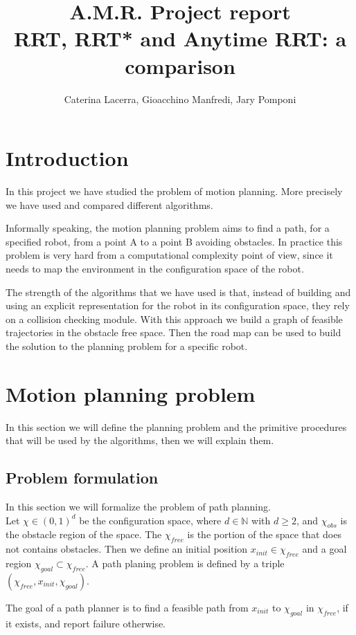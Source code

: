 \documentclass[10pt]{article}
\title{A.M.R. Project report\\RRT, RRT* and Anytime RRT: a comparison}
\author{Caterina Lacerra, Gioacchino Manfredi, Jary Pomponi}
\begin{document}
	\maketitle
	\section{Introduction}
	In this project we have studied the problem of motion planning. More precisely we have used and compared different algorithms. 
	
	Informally speaking, the motion planning problem aims to find a path, for a specified robot, from a point A to a point B avoiding obstacles. In practice this problem is very hard from a computational complexity point of view, since it needs to map the environment in the configuration space of the robot. 
	
	The strength of the algorithms that we have used is that, instead of building and using an explicit representation for the robot in its configuration space, they rely on a collision checking module. With this approach we build a graph of feasible trajectories in the obstacle free space. Then the road map can be used to build the solution to the planning problem for a specific robot.
	
	\section{Motion planning problem}
	In this section we will define the planning problem and the primitive procedures that will be used by the algorithms, then we will explain them.
	
	\subsection{Problem formulation}
	In this section we will formalize the problem of path planning.\\
	
	Let $\chi \in(0,1)^d$ be the configuration space, where $d\in\mathbb{N}$ with $d\ge2$, and $\chi_{obs}$ is the obstacle region of the space. The $\chi_{free}$ is the portion of the space that does not contains obstacles.
	Then we define an initial position $x_{init} \in \chi_{free}$ and a goal region $\chi_{goal} \subset \chi_{free}$. A path planing problem is defined by a triple $(\chi_{free},x_{init},\chi_{goal}) $. 
	
	The goal of a path planner is to find a feasible path from $x_{init}$ to $\chi_{goal}$ in $\chi_{free}$, if it exists, and report failure otherwise.\\
	
\end{document}
